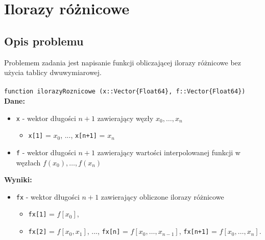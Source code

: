 \documentclass{article}
\begin{document}
\section{Ilorazy różnicowe}
\subsection{Opis problemu}
Problemem zadania jest napisanie funkcji obliczającej ilorazy różnicowe bez użycia tablicy dwuwymiarowej.\\ \\
\texttt{function ilorazyRoznicowe (x::Vector\{Float64\}, f::Vector\{Float64\})}
\\ 
\textbf{Dane:}
\begin{itemize}[label={}]
    \item \texttt{x} - wektor długości $n+1$ zawierający węzły $x_0, \dots, x_n$ 
        \begin{itemize}[label={}]
            \item \texttt{x[1]} = $x_0$, ..., \texttt{x[n+1]} = $x_n$
        \end{itemize}
    \item \texttt{f} - wektor długości $n+1$ zawierający wartości interpolowanej funkcji w węzłach $f(x_0), \dots, f(x_n)$
\end{itemize}
\textbf{Wyniki:}
\begin{itemize}[label={}]
    \item \texttt{fx} - wektor długości $n+1$ zawierający obliczone ilorazy różnicowe
    \begin{itemize}[label={}]
        \item \texttt{fx[1]} = $f[x_0]$,
        \item \texttt{fx[2]} = $f[x_0, x_1]$, ..., \texttt{fx[n]} = $f[x_0, \dots, x_{n-1}]$, \texttt{fx[n+1]} = $f[x_0, \dots, x_n]$.
    \end{itemize}
\end{itemize}
\end{document}
